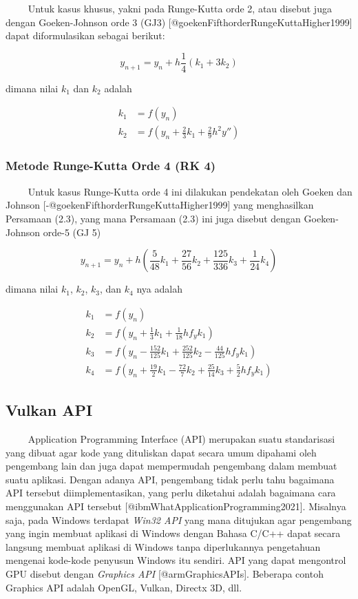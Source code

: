    Untuk kasus khusus, yakni pada Runge-Kutta orde 2, atau disebut juga
dengan Goeken-Johnson orde 3 (GJ3)
{[}@goekenFifthorderRungeKuttaHigher1999{]} dapat diformulasikan sebagai
berikut:

\[
\tag{2.2}
y_{n+1} = y_n + h \frac{1}{4} (k_1 + 3k_2)
\]

dimana nilai \(k_1\) dan \(k_2\) adalah

\[
\begin{aligned}
k_1 &= f(y_n)\\
k_2 &= f \left (y_n + \frac{2}{3}k_1 + \frac{2}{9}h^2 y''\right )
\end{aligned}
\]

\hypertarget{metode-runge-kutta-orde-4-rk-4}{%
\subsubsection{Metode Runge-Kutta Orde 4 (RK
4)}\label{metode-runge-kutta-orde-4-rk-4}}

   Untuk kasus Runge-Kutta orde 4 ini dilakukan pendekatan oleh Goeken
dan Johnson {[}-@goekenFifthorderRungeKuttaHigher1999{]} yang
menghasilkan Persamaan (2.3), yang mana Persamaan (2.3) ini juga disebut
dengan Goeken-Johnson orde-5 (GJ 5)

\[
\tag{2.3}
y_{n+1} = y_n + h \left ( \frac{5}{48} k_1 + \frac{27}{56} k_2 + \frac{125}{336}k_3 + \frac{1}{24}k_4 \right )
\]

dimana nilai \(k_1\), \(k_2\), \(k_3\), dan \(k_4\) nya adalah

\[
\begin{aligned}
k_1 &= f(y_n)\\
k_2 &= f \left ( y_n + \frac{1}{3}k_1 + \frac{1}{18}h f_y k_1 \right ) \\
k_3 &= f \left ( y_n - \frac{152}{125}k_1 + \frac{252}{125}k_2 - \frac{44}{125}h f_y k_1 \right ) \\
k_4 &= f \left ( y_n + \frac{19}{2}k_1 - \frac{72}{7}k_2 + \frac{25}{14}k_3 + \frac{5}{2} h f_y k_1 \right ) 
\end{aligned}
\]

\hypertarget{vulkan-api}{%
\subsection{Vulkan API}\label{vulkan-api}}

   Application Programming Interface (API) merupakan suatu standarisasi
yang dibuat agar kode yang dituliskan dapat secara umum dipahami oleh
pengembang lain dan juga dapat mempermudah pengembang dalam membuat
suatu aplikasi. Dengan adanya API, pengembang tidak perlu tahu bagaimana
API tersebut diimplementasikan, yang perlu diketahui adalah bagaimana
cara menggunakan API tersebut {[}@ibmWhatApplicationProgramming2021{]}.
Misalnya saja, pada Windows terdapat \emph{Win32 API} yang mana
ditujukan agar pengembang yang ingin membuat aplikasi di Windows dengan
Bahasa C/C++ dapat secara langsung membuat aplikasi di Windows tanpa
diperlukannya pengetahuan mengenai kode-kode penyusun Windows itu
sendiri. API yang dapat mengontrol GPU disebut dengan \emph{Graphics
API} {[}@armGraphicsAPIs{]}. Beberapa contoh Graphics API adalah OpenGL,
Vulkan, Directx 3D, dll.

